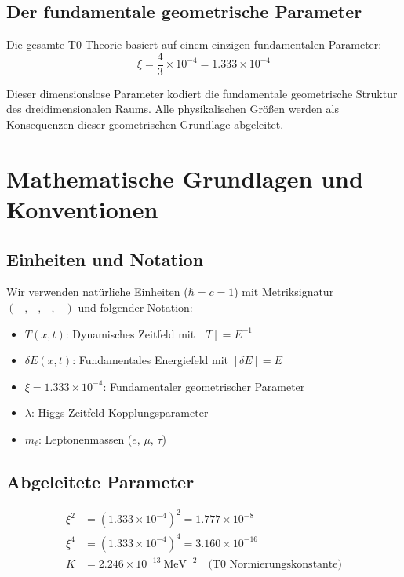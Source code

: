 \documentclass[12pt,a4paper]{article}
\begin{document}
	\subsection{Der fundamentale geometrische Parameter}
	
	\begin{keyresult}
		Die gesamte T0-Theorie basiert auf einem einzigen fundamentalen Parameter:
		\begin{equation}
			\boxed{\xi = \frac{4}{3} \times 10^{-4} = 1.333 \times 10^{-4}}
		\end{equation}
		
		Dieser dimensionslose Parameter kodiert die fundamentale geometrische Struktur des dreidimensionalen Raums. Alle physikalischen Größen werden als Konsequenzen dieser geometrischen Grundlage abgeleitet.
	\end{keyresult}
	
	\section{Mathematische Grundlagen und Konventionen}
	
	\subsection{Einheiten und Notation}
	
	Wir verwenden natürliche Einheiten ($\hbar = c = 1$) mit Metriksignatur $(+,-,-,-)$ und folgender Notation:
	
	\begin{itemize}
		\item $T(x,t)$: Dynamisches Zeitfeld mit $[T] = E^{-1}$
		\item $\delta E(x,t)$: Fundamentales Energiefeld mit $[\delta E] = E$
		\item $\xi = 1.333 \times 10^{-4}$: Fundamentaler geometrischer Parameter
		\item $\lambda$: Higgs-Zeitfeld-Kopplungsparameter
		\item $m_\ell$: Leptonenmassen ($e$, $\mu$, $\tau$)
	\end{itemize}
	
	\subsection{Abgeleitete Parameter}
	
	\begin{align}
		\xi^2 &= (1.333 \times 10^{-4})^2 = 1.777 \times 10^{-8} \\
		\xi^4 &= (1.333 \times 10^{-4})^4 = 3.160 \times 10^{-16} \\
		K &= 2.246 \times 10^{-13} \ \text{MeV}^{-2} \quad \text{(T0 Normierungskonstante)}
	\end{align}
	
\end{document}

